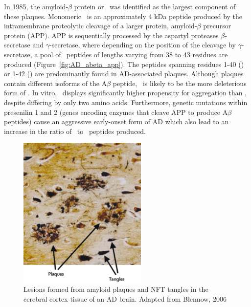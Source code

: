 In 1985, the amyloid-$\beta$ protein or \abeta\ was identified as the largest component of these plaques.\cite{Masters:1985wb}
Monomeric \abeta\ is an approximately 4 kDa peptide produced by the intramembrane proteolytic cleavage of a larger protein, amyloid-$\beta$ precursor protein (APP).\cite{Hardy:2002dh}
APP is sequentially processed by the aspartyl proteases $\beta$-secretase and $\gamma$-secretase, where depending on the position of the cleavage by $\gamma$-secretase, a pool of \abeta\ peptides of lengths varying from 38 to 43 residues are produced (Figure~\ref{fig:AD_abeta_app}).\cite{Gandy:2005dd} The peptides spanning residues 1-40 (\abetaforty) or 1-42 (\abetafortytwo) are predominantly found in AD-associated plaques.\cite{Golde:2000vg,Holtzman:2011gi} Although plaques contain different isoforms of the A$\beta$ peptide, \abetafortytwo\ is likely to be the more deleterious form of \abeta. In vitro, \abetafortytwo\ displays significantly higher propensity for aggregation than \abetaforty, despite differing by only two amino acids.\cite{Barrow:1992vz,Jarrett:1993ti,ElAgnaf:2000vr} Furthermore,  genetic mutations within presenilin 1 and 2 (genes encoding enzymes that cleave APP to produce A$\beta$ peptides) cause an aggressive early-onset form of AD which also lead to an increase in the ratio of \abetafortytwo\ to \abetaforty\ peptides produced.\cite{Hardy:1997tu,KumarSingh:2006kc,Bentahir:2006ih}

\begin{figure}
 \centering
 \includegraphics[width=2.5in]{figures/introduction/AD_tissue_pathology.pdf}
 \caption[AD tissue pathology]{Lesions formed from amyloid plaques and NFT tangles in the cerebral cortex tissue of an AD brain. Adapted from Blennow, 2006}
 \label{fig:AD_tissue_pathology}
\end{figure}

